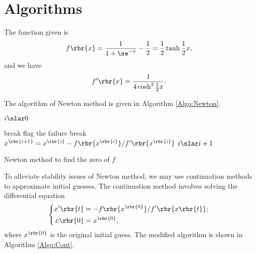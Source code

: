 \documentclass[english, nochinese]{pkupaper}
\title{\titlemark}
\author{\authoring}
\date{June 12, 2018}
\begin{document}
\maketitle

\section{Algorithms}

The function given is
\begin{equation}
f \rbr{x} = \frac{1}{ 1 + \se^{-x} } - \frac{1}{2} = \frac{1}{2} \tanh \frac{1}{2} x,
\end{equation}
and we have
\begin{equation}
f' \rbr{x} = \frac{1}{ 4 \cosh^2 \frac{1}{2} x }.
\end{equation}

The algorithm of Newton method is given in Algorithm \ref{Algo:Newton}.

\begin{algorithm}
\SetAlgoLined


\BlankLine

$ i \slar 0 $\;

{
    {
        break\;
    }
    {
        flag the failure\;
        break\;
    }
    $ x^{\rbr{ i + 1 }} = x^{\rbr{i}} - f \rbr{x^{\rbr{i}}} / f' \rbr{x^{\rbr{i}}} $\;
    $ i \slar i + 1 $\;
}


\BlankLine

\caption{Newton method to find the zero of $f$}
\label{Algo:Newton}
\end{algorithm}

To alleviate stability issues of Newton method, we may use continuation methods to approximate initial guesses. The continuation method involves solving the differential equation
\begin{equation} \label{Eq:Diff}
\left\{
\begin{aligned}
x' \rbr{t} &= -f \rbr{x^{\rbr{0}}} / f' \rbr{ x \rbr{t} }; \\
x \rbr{0} &= x^{\rbr{0}},
\end{aligned}
\right.
\end{equation}
where $x^{\rbr{0}}$ is the original initial guess. The modified algorithm is shown in Algorithm \ref{Algo:Cont}.
\end{document}
